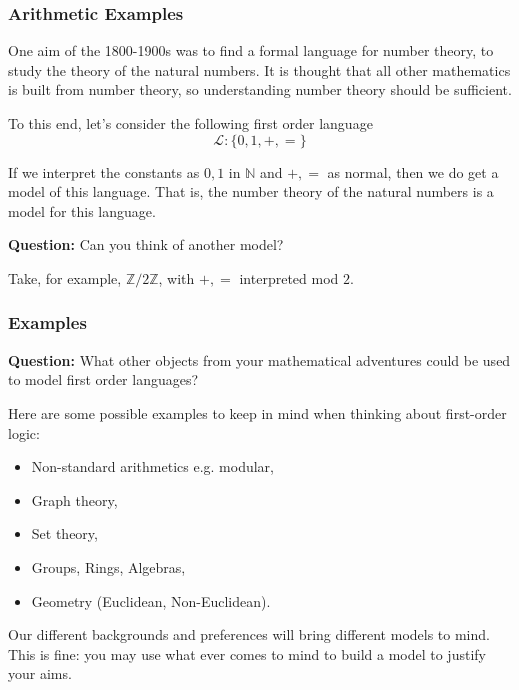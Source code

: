 \documentclass{beamer}
\theoremstyle{indentDefn} \newtheorem{defn}[]{Definition}
\begin{document}
\begin{frame}
	\frametitle{Arithmetic Examples}
	
	One aim of the 1800-1900s was to find a formal language for number theory, to study the theory of the natural numbers. It is thought that all other mathematics is built from number theory, so understanding number theory should be sufficient.
	
	\vspace{0.5cm} 
	
	To this end, let's consider the following first order language 
	$$\mathcal{L}: \{0,1,+,=\}$$
	
	\vspace{0.3cm} 
	
	If we interpret the constants as $0,1$ in $\mathbb{N}$ and $+,=$ as normal, then we do get a model of this language. That is, the number theory of the natural numbers is a model for this language. 
	
	\vspace{0.5cm} 
	
	{\bf Question:} Can you think of another model?
	
	\pause 
	
	Take, for example, $\mathbb{Z}/2\mathbb{Z}$, with $+,=$ interpreted mod $2$. 
	
\end{frame}

\begin{frame}
	\frametitle{Examples}
	
	{\bf Question:} What other objects from your mathematical adventures could be used to model first order languages? 
	
	\pause 
	
	\vspace{0.5cm}
	
	Here are some possible examples to keep in mind when thinking about first-order logic: 
	\begin{itemize}
		\item Non-standard arithmetics e.g. modular,
		\item Graph theory,
		\item Set theory,
		\item Groups, Rings, Algebras,
		\item Geometry (Euclidean, Non-Euclidean).
	\end{itemize}	

	Our different backgrounds and preferences will bring different models to mind. This is fine: you may use what ever comes to mind to build a model to justify your aims.

\end{frame}
\end{document}
